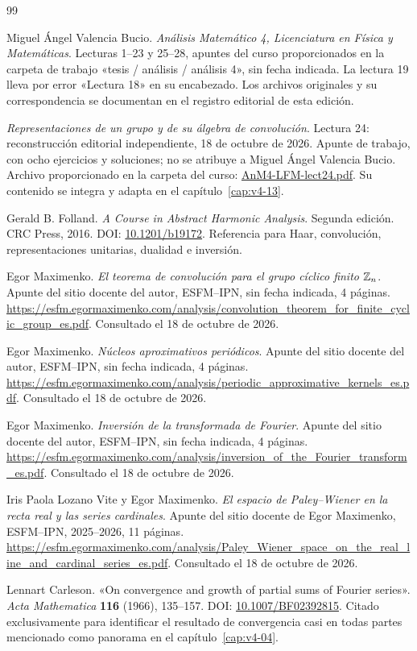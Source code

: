 \begin{thebibliography}{99}
Miguel Ángel Valencia Bucio. \emph{Análisis Matemático 4, Licenciatura en Física y Matemáticas}. Lecturas 1--23 y 25--28, apuntes del curso proporcionados en la carpeta de trabajo «tesis / análisis / análisis 4», sin fecha indicada. La lectura 19 lleva por error «Lectura 18» en su encabezado. Los archivos originales y su correspondencia se documentan en el registro editorial de esta edición.

\emph{Representaciones de un grupo y de su álgebra de convolución}. Lectura 24: reconstrucción editorial independiente, 18 de octubre de 2026. Apunte de trabajo, con ocho ejercicios y soluciones; no se atribuye a Miguel Ángel Valencia Bucio. Archivo proporcionado en la carpeta del curso: \href{https://drive.google.com/file/d/1S_Am0ooAvf7IKqq7bVcxAlXrou3z1rO0/view}{AnM4-LFM-lect24.pdf}. Su contenido se integra y adapta en el capítulo~\ref{cap:v4-13}.

Gerald B. Folland. \emph{A Course in Abstract Harmonic Analysis}. Segunda edición. CRC Press, 2016. DOI: \href{https://doi.org/10.1201/b19172}{10.1201/b19172}. Referencia para Haar, convolución, representaciones unitarias, dualidad e inversión.

Egor Maximenko. \emph{El teorema de convolución para el grupo cíclico finito $\mathbb Z_n$}. Apunte del sitio docente del autor, ESFM--IPN, sin fecha indicada, 4 páginas. \url{https://esfm.egormaximenko.com/analysis/convolution_theorem_for_finite_cyclic_group_es.pdf}. Consultado el 18 de octubre de 2026.

Egor Maximenko. \emph{Núcleos aproximativos periódicos}. Apunte del sitio docente del autor, ESFM--IPN, sin fecha indicada, 4 páginas. \url{https://esfm.egormaximenko.com/analysis/periodic_approximative_kernels_es.pdf}. Consultado el 18 de octubre de 2026.

Egor Maximenko. \emph{Inversión de la transformada de Fourier}. Apunte del sitio docente del autor, ESFM--IPN, sin fecha indicada, 4 páginas. \url{https://esfm.egormaximenko.com/analysis/inversion_of_the_Fourier_transform_es.pdf}. Consultado el 18 de octubre de 2026.

Iris Paola Lozano Vite y Egor Maximenko. \emph{El espacio de Paley--Wiener en la recta real y las series cardinales}. Apunte del sitio docente de Egor Maximenko, ESFM--IPN, 2025--2026, 11 páginas. \url{https://esfm.egormaximenko.com/analysis/Paley_Wiener_space_on_the_real_line_and_cardinal_series_es.pdf}. Consultado el 18 de octubre de 2026.

Lennart Carleson. «On convergence and growth of partial sums of Fourier series». \emph{Acta Mathematica} \textbf{116} (1966), 135--157. DOI: \href{https://doi.org/10.1007/BF02392815}{10.1007/BF02392815}. Citado exclusivamente para identificar el resultado de convergencia casi en todas partes mencionado como panorama en el capítulo~\ref{cap:v4-04}.
\end{thebibliography}
